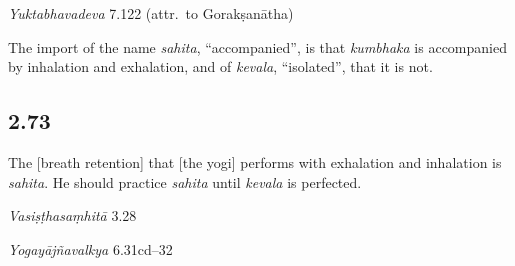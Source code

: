 \begin{ekdosis}
\begin{testimonia}[hp02_072]
\emph{Yuktabhavadeva} 7.122 (attr.~to Gorakṣanātha)

\begin{versinnote}
\end{versinnote}
\end{testimonia}

\begin{philcomm}[hp02_072]
The import of the name \emph{sahita}, “accompanied”, is that \emph{kumbhaka} is accompanied by inhalation and exhalation, and of \emph{kevala}, “isolated”, that it is not.
\end{philcomm}

\subsection*{2.73}
\begin{translation}[hp02_073]
The [breath retention] that [the yogi] performs with exhalation and inhalation is \emph{sahita}. He should practice \emph{sahita} until \emph{kevala} is perfected.
\end{translation}


\begin{sources}[hp02_073]
\emph{Vasiṣṭhasaṃhitā} 3.28

\begin{versinnote}
\tl{\var{28a virecyāpūrya ] recyavāpūrya yat \emph{la}, ārecyāpūrya yaḥ \emph{śa}}\\!}
\end{versinnote}

\emph{Yogayājñavalkya} 6.31cd–32

\begin{versinnote}
\end{versinnote}


\end{sources}
\end{ekdosis}
